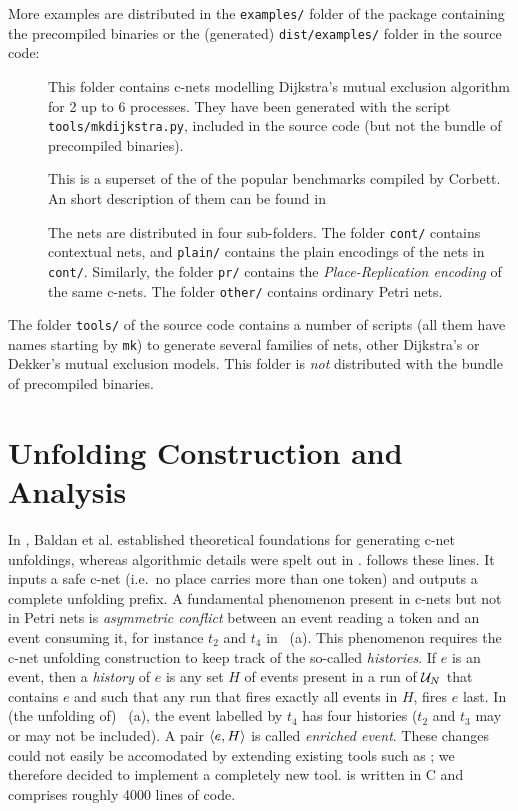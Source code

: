 \documentclass[a4paper]{refart}
\begin{document}
More examples are distributed in the \verb!examples/! folder of the package
containing the precompiled binaries or the (generated) \verb!dist/examples/!
folder in the source code:
\begin{description}
\item[]
  This folder contains c-nets modelling Dijkstra's mutual exclusion
  algorithm\cite{Dij65} for 2 up to 6 processes.
  They have been generated with the script \verb!tools/mkdijkstra.py!,
  included in the source code (but not the bundle of precompiled binaries).

\item[]
  This is a superset of the of the popular benchmarks compiled by
  Corbett\cite{Cor96}.
  An short description of them can be found in\cite[--31]{Kho03}
  
  The nets are distributed in four sub-folders.
  The folder \verb!cont/! contains contextual nets,
  and \verb!plain/! contains the plain encodings of the nets in
  \verb!cont/!.  Similarly, the folder \verb!pr/! contains the
  \emph{Place-Replication encoding}\cite{VSY98} of the same c-nets.
  The folder \verb!other/! contains ordinary Petri nets.
\end{description}

The folder \verb!tools/! of the source code contains a number of scripts (all
them have names starting by \verb!mk!) to generate several families of nets,
other Dijkstra's or Dekker's mutual exclusion models.
This folder is \emph{not} distributed with the bundle of precompiled binaries.

\iffalse%
\section{Unfolding Construction and Analysis}
\label{s:cons}

In \cite{BCKS08}, Baldan et al. established theoretical foundations for
generating c-net unfoldings, whereas algorithmic details were spelt out
in \cite{BBC+12}. \cunf{} follows these lines. It inputs a
safe c-net (i.e.\ no place carries more than one token)
and outputs a complete unfolding prefix. A fundamental phenomenon present
in c-nets but not in Petri nets is \emph{asymmetric conflict} between an
event reading a token and an event consuming it, for instance
$t_2$ and $t_4$ in ~(a).
This phenomenon requires the c-net unfolding construction
to keep track of the so-called \emph{histories}. If $e$ is an event,
then 
a \emph{history} of $e$ is any set $H$ of events present in a run of
$\mathcal{U}_{N}$ that contains $e$ and such that any run that fires exactly all events
in $H$, fires $e$ last.
In (the unfolding of) ~(a), the event labelled by $t_4$ has four
histories ($t_2$ and $t_3$ may or may not be included).
A pair $\langle e, H\rangle$ is called \emph{enriched event}. These changes could
not easily be accomodated by extending existing tools such as \mole{};
we therefore decided to implement a completely new tool. \cunf{} is written
in C and comprises roughly 4000 lines of code.
\end{document}
